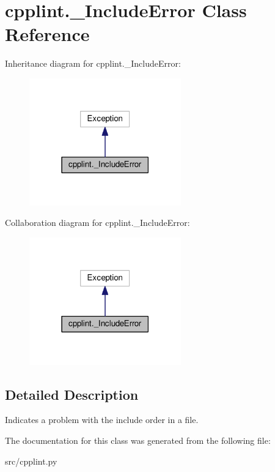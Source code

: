\hypertarget{classcpplint_1_1__IncludeError}{}\section{cpplint.\+\_\+\+Include\+Error Class Reference}
\label{classcpplint_1_1__IncludeError}


Inheritance diagram for cpplint.\+\_\+\+Include\+Error\+:
\nopagebreak
\begin{figure}[H]
\begin{center}
\leavevmode
\includegraphics[width=186pt]{classcpplint_1_1__IncludeError__inherit__graph}
\end{center}
\end{figure}


Collaboration diagram for cpplint.\+\_\+\+Include\+Error\+:
\nopagebreak
\begin{figure}[H]
\begin{center}
\leavevmode
\includegraphics[width=186pt]{classcpplint_1_1__IncludeError__coll__graph}
\end{center}
\end{figure}


\subsection{Detailed Description}
\begin{DoxyVerb}Indicates a problem with the include order in a file.\end{DoxyVerb}
 

The documentation for this class was generated from the following file\+:\begin{DoxyCompactItemize}
\item 
src/cpplint.\+py\end{DoxyCompactItemize}
